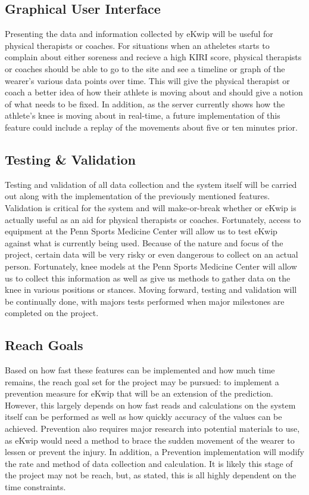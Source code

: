 \subsection {Graphical User Interface}
Presenting the data and information collected by eKwip will be useful for physical therapists or coaches. For situations when an atheletes starts to complain about either soreness and recieve a high KIRI score, physical therapists or coaches should be able to go to the site and see a timeline or graph of the wearer's various data points over time. This will give the physical therapist or coach a better idea of how their athlete is moving about and should give a notion of what needs to be fixed. In addition, as the server currently shows how the athlete's knee is moving about in real-time, a future implementation of this feature could include a replay of the movements about five or ten minutes prior.

\subsection {Testing & Validation}
Testing and validation of all data collection and the system itself will be carried out along with the implementation of the previously mentioned features. Validation is critical for the system and will make-or-break whether or eKwip is actually useful as an aid for physical therapists or coaches. Fortunately, access to equipment at the Penn Sports Medicine Center will allow us to test eKwip against what is currently being used. Because of the nature and focus of the project, certain data will be very risky or even dangerous to collect on an actual person. Fortunately, knee models at the Penn Sports Medicine Center will allow us to collect this information as well as give us methods to gather data on the knee in various positions or stances. Moving forward, testing and validation will be continually done, with majors tests performed when major milestones are completed on the project.

\subsection {Reach Goals}
Based on how fast these features can be implemented and how much time remains, the reach goal set for the project may be pursued: to implement a prevention measure for eKwip that will be an extension of the prediction. However, this largely depends on how fast reads and calculations on the system itself can be performed as well as how quickly accuracy of the values can be achieved. Prevention also requires major research into potential materials to use, as eKwip would need a method to brace the sudden movement of the wearer to lessen or prevent the injury. In addition, a Prevention implementation will modify the rate and method of data collection and calculation. It is likely this stage of the project may not be reach, but, as stated, this is all highly dependent on the time constraints. 
